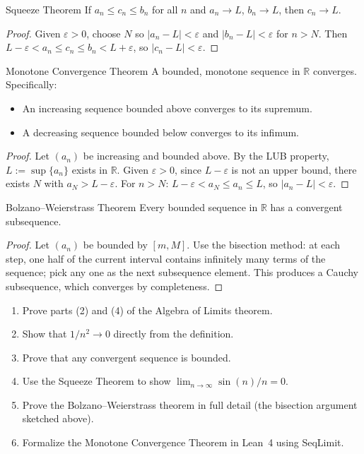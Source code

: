 \documentclass[12pt, openany]{book}
\theoremstyle{plain}
\theoremstyle{definition}
\theoremstyle{remark}
\newcommand{\R}{\mathbb{R}}
\newcommand{\eps}{\varepsilon}
\newcommand{\li}[1]{{\ttfamily\small\color{tealaccent}#1}}
\begin{document}
\begin{thmbox}{Squeeze Theorem}
If $a_n \leq c_n \leq b_n$ for all $n$ and $a_n \to L$, $b_n \to L$, then $c_n \to L$.
\end{thmbox}
\color{black}

\begin{proof}
Given $\eps > 0$, choose $N$ so $|a_n - L| < \eps$ and $|b_n - L| < \eps$ for $n > N$. Then $L - \eps < a_n \leq c_n \leq b_n < L + \eps$, so $|c_n - L| < \eps$.
\end{proof}

\begin{thmbox}{Monotone Convergence Theorem}
A bounded, monotone sequence in $\R$ converges. Specifically:
\begin{itemize}[noitemsep]
  \item An increasing sequence bounded above converges to its supremum.
  \item A decreasing sequence bounded below converges to its infimum.
\end{itemize}
\end{thmbox}
\color{black}

\begin{proof}
Let $(a_n)$ be increasing and bounded above. By the LUB property, $L := \sup\{a_n\}$ exists in $\R$. Given $\eps > 0$, since $L - \eps$ is not an upper bound, there exists $N$ with $a_N > L - \eps$. For $n > N$: $L - \eps < a_N \leq a_n \leq L$, so $|a_n - L| < \eps$.
\end{proof}

\begin{thmbox}{Bolzano--Weierstrass Theorem}
Every bounded sequence in $\R$ has a convergent subsequence.
\end{thmbox}
\color{black}

\begin{proof}
Let $(a_n)$ be bounded by $[m, M]$. Use the bisection method: at each step, one half of the current interval contains infinitely many terms of the sequence; pick any one as the next subsequence element. This produces a Cauchy subsequence, which converges by completeness.
\end{proof}

\begin{exbox}
\begin{enumerate}
  \item Prove parts (2) and (4) of the Algebra of Limits theorem.
  \item Show that $1/n^2 \to 0$ directly from the definition.
  \item Prove that any convergent sequence is bounded.
  \item Use the Squeeze Theorem to show $\lim_{n\to\infty} \sin(n)/n = 0$.
  \item Prove the Bolzano--Weierstrass theorem in full detail (the bisection argument sketched above).
  \item Formalize the Monotone Convergence Theorem in Lean~4 using \li{SeqLimit}.
\end{enumerate}
\end{exbox}
\color{black}
\end{document}
